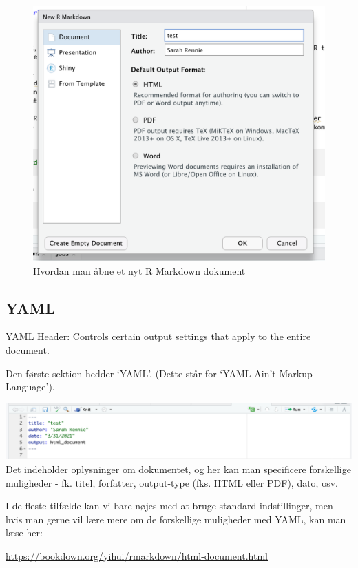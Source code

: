 \documentclass[
]{book}
\begin{document}
\begin{figure}
\centering
\includegraphics{plots/create_new_rmarkdown.png}
\caption{Hvordan man åbne et nyt R Markdown dokument}
\end{figure}

\hypertarget{yaml}{%
\subsection{YAML}\label{yaml}}

YAML Header: Controls certain output settings that apply to the entire document.

Den første sektion hedder `YAML'. (Dette står for `YAML Ain't Markup Language').

\includegraphics{plots/YAML.png}
Det indeholder oplysninger om dokumentet, og her kan man specificere forskellige muligheder - fk. titel, forfatter, output-type (fks. HTML eller PDF), dato, osv.

I de fleste tilfælde kan vi bare nøjes med at bruge standard indstillinger, men hvis man gerne vil lære mere om de forskellige muligheder med YAML, kan man læse her:

\url{https://bookdown.org/yihui/rmarkdown/html-document.html}
\end{document}
